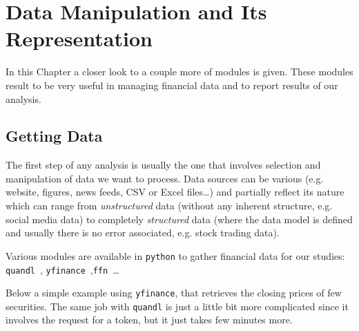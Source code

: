 \chapter{Data Manipulation and Its Representation}
\label{sec:datamanip}
In this Chapter a closer look to a couple more of modules is given. These modules result to be very useful in managing financial data and to report results of our analysis.

\section{Getting Data}\label{getting-data}

The first step of any analysis is usually the one that involves selection and manipulation of data we want to process. Data sources can be various (e.g. website, figures, news feeds, CSV or Excel files\ldots) and partially reflect its nature which can range from \emph{unstructured} data (without any inherent structure, e.g. social media data) to completely \emph{structured} data (where the data model is defined and usually there is no error associated, e.g. stock trading data).

Various modules are available in \texttt{python} to gather financial data for our studies: \texttt{quandl}~\cite{bib:quandl}, \texttt{yfinance}~\cite{bib:yfinance},\texttt{ffn}~\cite{bib:ffn}\ldots

Below a simple example using \texttt{yfinance}, that retrieves the closing prices of few securities. The same job with \texttt{quandl} is just a little bit more complicated since it involves the request for a token, but it just takes few minutes more.  

